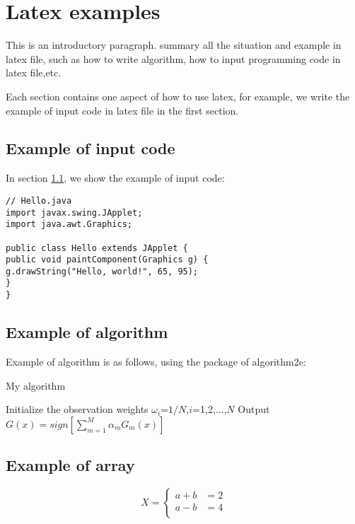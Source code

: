 \chapter{Latex examples}

This is an introductory paragraph. summary all the situation and example in latex file, such as how to write algorithm, how to input programming code in latex file,etc.

Each section contains one aspect of how to use latex, for example, we write the example of input code in latex file in the first section.

\section{Example of input code}\label{sec:input_code}
In section \ref{sec:input_code}, we show the example of input code:

\begin{lstlisting}
// Hello.java
import javax.swing.JApplet;
import java.awt.Graphics;

public class Hello extends JApplet {
public void paintComponent(Graphics g) {
g.drawString("Hello, world!", 65, 95);
}    
}
\end{lstlisting}


\section{Example of algorithm}
Example of algorithm is as follows, using the package of algorithm2e:\\

\begin{algorithm}[H]
\caption{My algorithm}\label{euclid}
		    \nl Initialize the observation weights $\omega_i$=$1/N$,$i$=1,2,...,$N$\;
		    \nl {}
		    \nl Output $G(x)=sign[\sum_{m=1}^{M}\alpha_m G_m(x)]$ \;
\end{algorithm}

\section{Example of array}
\begin{equation*}
X=\left\{
\begin{aligned}
a+b&=2\\
a-b&=4\\
\end{aligned}
\right.
\end{equation*}
